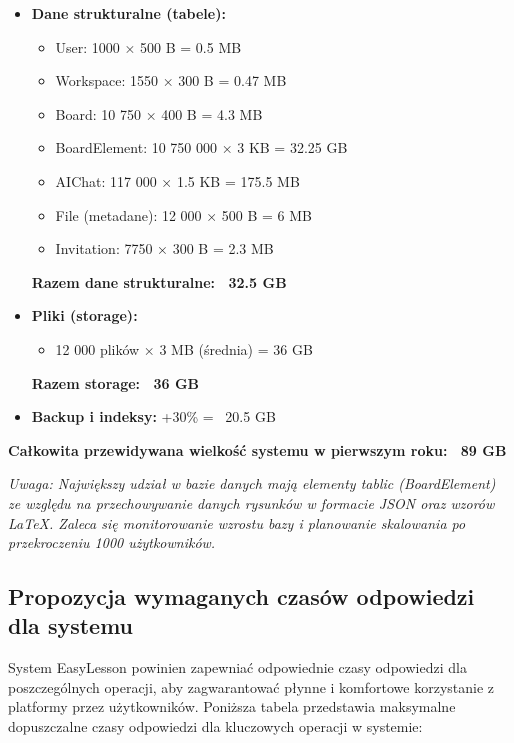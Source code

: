 \documentclass[12pt,a4paper]{article}
\begin{document}
\begin{itemize}[leftmargin=*]
    \item \textbf{Dane strukturalne (tabele):}
    \begin{itemize}
        \item User: 1000 × 500 B = 0.5 MB
        \item Workspace: 1550 × 300 B = 0.47 MB
        \item Board: 10 750 × 400 B = 4.3 MB
        \item BoardElement: 10 750 000 × 3 KB = 32.25 GB
        \item AIChat: 117 000 × 1.5 KB = 175.5 MB
        \item File (metadane): 12 000 × 500 B = 6 MB
        \item Invitation: 7750 × 300 B = 2.3 MB
    \end{itemize}
    \textbf{Razem dane strukturalne: ~32.5 GB}
    
    \item \textbf{Pliki (storage):}
    \begin{itemize}
        \item 12 000 plików × 3 MB (średnia) = 36 GB
    \end{itemize}
    \textbf{Razem storage: ~36 GB}
    
    \item \textbf{Backup i indeksy:} +30\% = ~20.5 GB
\end{itemize}

\textbf{Całkowita przewidywana wielkość systemu w pierwszym roku: ~89 GB}

\vspace{1em}
\textit{Uwaga: Największy udział w bazie danych mają elementy tablic (BoardElement) ze względu na przechowywanie danych rysunków w formacie JSON oraz wzorów LaTeX. Zaleca się monitorowanie wzrostu bazy i planowanie skalowania po przekroczeniu 1000 użytkowników.}

\subsection{Propozycja wymaganych czasów odpowiedzi dla systemu}

System EasyLesson powinien zapewniać odpowiednie czasy odpowiedzi dla poszczególnych operacji, aby zagwarantować płynne i komfortowe korzystanie z platformy przez użytkowników. Poniższa tabela przedstawia maksymalne dopuszczalne czasy odpowiedzi dla kluczowych operacji w systemie:
\end{document}
